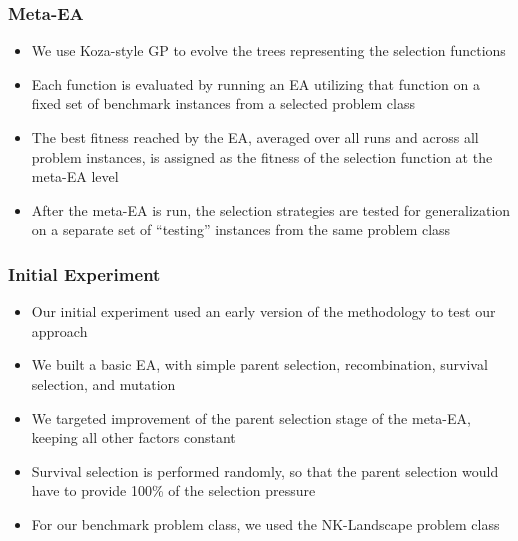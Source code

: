 \documentclass{beamer}
\begin{document}
	\begin{frame}
		\frametitle{Meta-EA}
		
		\begin{itemize}
			 \item<1-|alert@1> We use Koza-style GP to evolve the trees representing the selection functions
			 \item<2-|alert@2> Each function is evaluated by running an EA utilizing that function on a fixed set of benchmark instances from a selected problem class	
			 \item<3-|alert@3> The best fitness reached by the EA, averaged over all runs and across all problem instances, is assigned as the fitness of the selection function at the meta-EA level 		 
			 \item<4-|alert@4> After the meta-EA is run, the selection strategies are tested for generalization on a separate set of ``testing'' instances from the same problem class
		\end{itemize}
	\end{frame}
	

	\begin{frame}
		\frametitle{Initial Experiment}
		
		\begin{itemize}
			 \item<1-|alert@1> Our initial experiment used an early version of the methodology to test our approach
			 \item<2-|alert@2> We built a basic EA, with simple parent selection, recombination, survival selection, and mutation
			 \item<3-|alert@3> We targeted improvement of the parent selection stage of the meta-EA, keeping all other factors constant			 
			 \item<4-|alert@4> Survival selection is performed randomly, so that the parent selection would have to provide 100\% of the selection pressure
			 \item<5-|alert@5> For our benchmark problem class, we used the NK-Landscape problem class		 
		\end{itemize}
	\end{frame}
\end{document}
